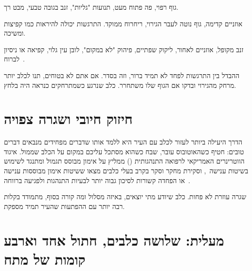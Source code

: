 \begin{tcbraster}[raster columns=3,raster equal height,raster column skip=6pt,
   raster before skip=6pt,raster after skip=8pt,
   raster every box/.append style={before upper={\raggedright}}] %
  \begin{tcolorbox}[enhanced,colback=sage!14!white,colframe=sagedark,arc=2mm,boxrule=0.8pt,
     title={\sffamily\bfseries רגוע ונינוח},colbacktitle=sagedark,fontupper=\small,left=4pt,right=4pt]
    גוף רפוי, פה פתוח מעט, תנועות "גליות", זנב בגובה טבעי, מבט רך.
  \end{tcolorbox}
  \begin{tcolorbox}[enhanced,colback=gold!16!white,colframe=golddark,arc=2mm,boxrule=0.8pt,
     title={\sffamily\bfseries סקרן או נרגש},colbacktitle=golddark,fontupper=\small,left=4pt,right=4pt]
    אוזניים קדימה, גוף נוטה לעבר הגירוי, ריחרוח ממוקד. התרגשות יכולה להיראות כמו קפיצות ומשיכה.
  \end{tcolorbox}
  \begin{tcolorbox}[enhanced,colback=coral!14!white,colframe=coraldark,arc=2mm,boxrule=0.8pt,
     title={\sffamily\bfseries לחוץ או מפחד},colbacktitle=coraldark,fontupper=\small,left=4pt,right=4pt]
    זנב מקופל, אוזניים לאחור, ליקוק שפתיים, פיהוק "לא במקום", לובן עין גלוי, קפיאה או ניסיון לברוח~\cite{rspca-behaviour,aspcapro-body}.
  \end{tcolorbox}
\end{tcbraster}

ההבדל בין התרגשות לפחד לא תמיד ברור, וזה בסדר. אם אתם לא בטוחים, תנו לכלב יותר מרחק מהגירוי
ובדקו אם הגוף שלו משתחרר. כלב שנרגע כשמתרחקים כנראה היה בלחץ.

\section{חיזוק חיובי ושגרה צפויה}
הדרך היעילה ביותר לעזור לכלב עם העיר היא ללמד אותו שדברים מפחידים מנבאים דברים טובים: חטיף
כשהאוטובוס עובר, שבח כשהוא מסתכל עליכם במקום על הכלב שממול. איגוד הווטרינרים האמריקאי לרפואה
התנהגותית () ממליץ על אימון מבוסס תגמול ומתנגד לשימוש בשיטות ענישה~\cite{avsab2021}, וסקירת
מחקר וסקר בקרב בעלי כלבים מצאו ששיטות אימון מבוססות ענישה או הפחדה קשורות לסיכון גבוה יותר
לבעיות התנהגות ולפגיעה ברווחה~\cite{ziv2017,hiby2004}.

שגרה עוזרת לא פחות. כלב שיודע מתי יוצאים, באיזה מסלול ומה קורה בסוף, מתמודד בקלות רבה יותר
עם ההפתעות שהעיר תמיד מספקת.

\section{מעלית: שלושה כלבים, חתול אחד וארבע קומות של מתח}

